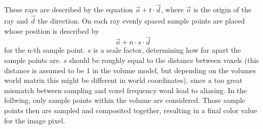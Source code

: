 These rays are described by the equation $\vec{o} + t \cdot \vec{d}$, where $\vec{o}$ is the origin of the ray and $\vec{d}$ the direction. On each ray evenly spaced sample points are placed whose position is described by 
\begin{equation}
\vec{o} + n \cdot s \cdot \vec{d}
\end{equation}
for the n-th sample point. $s$ is a scale factor, determining how far apart the sample points are. $s$ should be roughly equal to the distance between voxels (this distance is assumed to be 1 in the volume model, but depending on the volumes world matrix this might be different in world coordinates), since a too great mismatch between sampling and voxel frequency woul lead to aliasing.
In the follwing, only sample points within the volume are considered. Those sample points then are sampled and composited together, resulting in a final color value for the image pixel.
